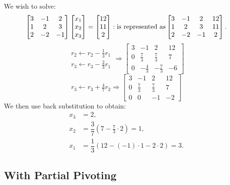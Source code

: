 \begin{example}\label{example:SecondGE}
We wish to solve:
\[
\begin{bmatrix} 3 & -1 & 2\\ 1 & 2 & 3\\ 2 & -2 & -1\end{bmatrix}\begin{bmatrix} x_1\\x_2\\x_3\end{bmatrix} = \begin{bmatrix}12\\11\\2\end{bmatrix}:\hbox{is represented as} \begin{bmatrix} 3 & -1 & 2 & 12\\ 1 & 2 & 3 & 11\\ 2 & -2 & -1 & 2\end{bmatrix}.
\]
\[
\begin{array}{c} r_2 \leftarrow r_2 - \frac{1}{3}r_1\\ r_3 \leftarrow r_3 - \frac{2}{3} r_1\end{array} \Rightarrow \begin{bmatrix} 3 & -1 & 2 & 12\\ 0 & \frac{7}{3} & \frac{7}{3} & 7\\ 0 & -\frac{4}{3} & -\frac{7}{3} & -6\end{bmatrix}
\]
\[
r_3 \leftarrow r_3 + \tfrac{4}{7}r_2 \Rightarrow \begin{bmatrix} 3 & -1 & 2 & 12\\ 0 & \frac{7}{3} & \frac{7}{3} & 7\\ 0 & 0 & -1 & -2\end{bmatrix}
\]
We then use back substitution to obtain:
\begin{align*}
x_3 & = 2,\\
x_2 & = \dfrac{3}{7}\left(7 - \frac{7}{3}\cdot2\right) = 1,\\
x_1 & = \dfrac{1}{3}\left(12 - (-1)\cdot1-2\cdot2\right) = 3.
\end{align*}
\end{example}

\subsection{With Partial Pivoting}

